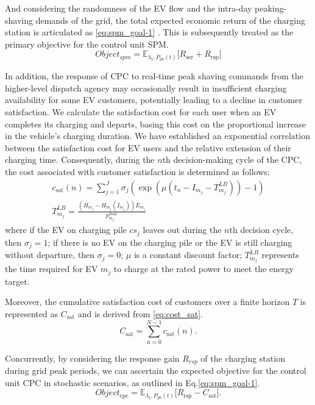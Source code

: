 \documentclass[preprint,12pt]{elsarticle}
\begin{document}
And considering the randomness of the EV flow and the intra-day peaking-shaving demands of the grid, the total expected economic return of the charging station is articulated as \ref{eq:spm_goal-1} . This is subsequently treated as the primary objective for the control unit SPM.
\begin{equation}
\mathit{Object_{\textrm{spm}}}=\mathbb{E}_{\lambda_{t},P_{\textrm{ps}}\left(t\right)}\Biggl[R_{\textrm{ser}}+R_{\textrm{rsp}}\Biggr]\label{eq:spm_goal-1}
\end{equation}

In addition, the response of CPC to real-time peak shaving commands from the higher-level dispatch agency may occasionally result in insufficient charging availability for some EV customers, potentially leading to a decline in customer satisfaction. We calculate the satisfaction cost for each user when an EV completes its charging and departs, basing this cost on the proportional increase in the vehicle's charging duration. We have established an exponential correlation between the satisfaction cost for EV users and the relative extension of their charging time. Consequently, during the $n$th decision-making cycle of the CPC, the cost associated with customer satisfaction is determined as follows:
\begin{equation}
\begin{array}{c}
c_{\textrm{sat}}(n)=\sum_{j=1}^{J}\sigma_{j}(\exp(\mu(t_{n}-I_{m_{j}}-T_{m_{j}}^{LB}))-1)\\
T_{m_{j}}^{LB}=\frac{(\bar{H}_{m_{j}}-H_{m_{j}}(I_{m_{j}}))E_{m_{j}}}{p_{m_{j}}^{max}}
\end{array}
\end{equation}
where if the EV on charging pile $cs_{j}$ leaves out during the $n$th decision cycle, then $\sigma_{j}=1$; if there is no EV on the charging pile or the EV is still charging without departure, then $\sigma_{j}=0$;
$\mu$ is a constant discount factor; $T_{m_{j}}^{LB}$ represents the time required for EV $m_{j}$ to charge at the rated power to meet the energy target.

Moreover, the cumulative satisfaction cost of customers over a finite horizon $T$ is represented as $C_\textrm{sat}$ and is derived from \ref{eq:cost_sat}.
\begin{equation}
C_{\textrm{sat}}=\sum_{n=0}^{N-1}c_{\textrm{sat}}(n).\label{eq:cost_sat}
\end{equation}

Concurrently, by considering the response gain $R_{rsp}$ of the charging station during grid peak periods, we can ascertain the expected objective for the control unit CPC in stochastic scenarios, as outlined in Eq.\ref{eq:spm_goal-1}.
\begin{equation}
Object_{\textrm{cpc}}=\mathbb{E}_{\lambda_{t},P_{\textrm{ps}}\left(t\right)}\Biggl[R_{\textrm{rsp}}-C_{\textrm{sat}}\Biggr].\label{eq:cpc_goal-1}
\end{equation}
\end{document}
